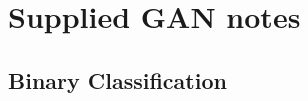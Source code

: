 \documentclass[11pt]{article}
\begin{document}
\begin{figure}[H]
    \centering
\end{figure}

\section{Supplied GAN notes}

\subsection{Binary Classification}\label{app:gan:Binary Classification}
\end{document}
